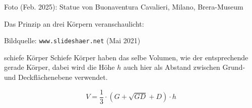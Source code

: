 {\footnotesize {Foto (Feb. 2025): Statue von Buonaventura
      Cavalieri, Milano, Brera-Museum}}

\vspace{4mm}

Das Prinzip an drei Körpern veranschaulicht:

Bildquelle: \texttt{www.slideshaer.net} (Mai 2021)
\vspace{9mm}

\begin{gesetz}{schiefe Körper}{}
  Schiefe Körper haben das selbe Volumen, wie der entsprechende gerade Körper, dabei wird die Höhe $h$ auch hier als Abstand zwischen Grund- und Deckflächenebene verwendet.

  $$ V = \frac13 \cdot{} \left(G + \sqrt{GD} + D \right) \cdot{} h $$
\end{gesetz}

\newpage
